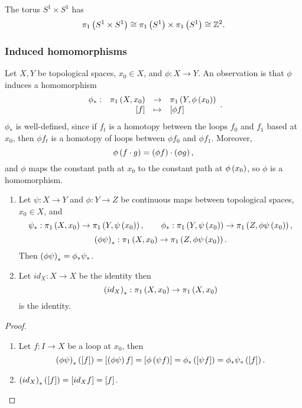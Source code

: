 \begin{example*}
The torus $ S^1 \times S^1 $ has
$$ \pi_1\left( S^1 \times S^1 \right) \cong \pi_1\left( S^1 \right) \times \pi_1\left( S^1 \right) \cong \mathbb{Z}^2. $$
\end{example*}

\subsubsection{Induced homomorphisms}

Let $ X, Y $ be topological spaces, $ x_0 \in X $, and $ \phi : X \to Y $. An observation is that $ \phi $ induces a homomorphism
$$ \function[\phi_*]{\pi_1\rb{X, x_0}}{\pi_1\rb{Y, \phi\rb{x_0}}}{\sb{f}}{\sb{\phi f}}. $$
$ \phi_* $ is well-defined, since if $ f_t $ is a homotopy between the loops $ f_0 $ and $ f_1 $ based at $ x_0 $, then $ \phi f_t $ is a homotopy of loops between $ \phi f_0 $ and $ \phi f_1 $. Moreover,
$$ \phi\left( f \cdot g \right) = \left( \phi f \right) \cdot \left( \phi g \right), $$
and $ \phi $ maps the constant path at $ x_0 $ to the constant path at $ \phi\left( x_0 \right) $, so $ \phi $ is a homomorphism.

\begin{proposition}
\hfill
\begin{enumerate}
\item Let $ \psi : X \to Y $ and $ \phi : Y \to Z $ be continuous maps between topological spaces, $ x_0 \in X $, and
$$ \psi_* : \pi_1\left( X, x_0 \right) \to \pi_1\left( Y, \psi\left( x_0 \right) \right), \qquad \phi_* : \pi_1\left( Y, \psi\left( x_0 \right) \right) \to \pi_1\left( Z, \phi\psi\left( x_0 \right) \right), $$
$$ \left( \phi\psi \right)_* : \pi_1\left( X, x_0 \right) \to \pi_1\left( Z, \phi\psi\left( x_0 \right) \right). $$
Then $ \left( \phi\psi \right)_* = \phi_*\psi_* $.
\item Let $ id_X : X \to X $ be the identity then
$$ \left( id_X \right)_* : \pi_1\left( X, x_0 \right) \to \pi_1\left( X, x_0 \right) $$
is the identity.
\end{enumerate}
\end{proposition}

\begin{proof}
\hfill
\begin{enumerate}
\item Let $ f : I \to X $ be a loop at $ x_0 $, then
$$ \left( \phi\psi \right)_*\left( \left[ f \right] \right) = \left[ \left( \phi\psi \right)f \right] = \left[ \phi\left( \psi f \right) \right] = \phi_*\left( \left[ \psi f \right] \right) = \phi_*\psi_*\left( \left[ f \right] \right). $$
\item $ \left( id_X \right)_*\left( \left[ f \right] \right) = \left[ id_Xf \right] = \left[ f \right] $.
\end{enumerate}
\end{proof}

